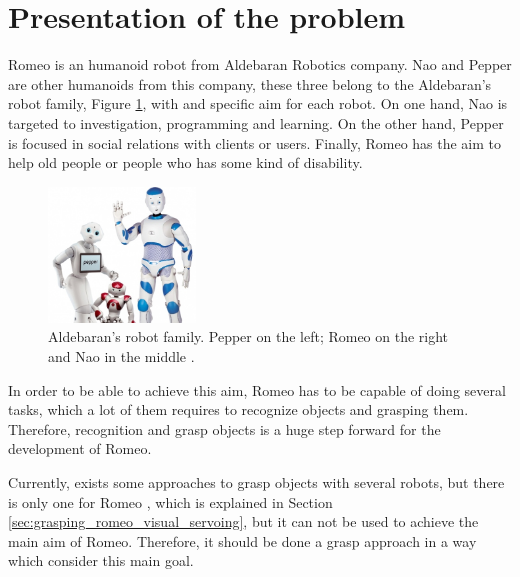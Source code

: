 \documentclass[12pt,a4paper,final,twoside,openright]{report}
\begin{document}

\section{Presentation of the problem}

Romeo is an humanoid robot from Aldebaran Robotics company. Nao and Pepper are other humanoids from this company, these three belong to the Aldebaran's robot family, Figure \ref{fig:aldebaran_family}, with and specific aim for each robot. On one hand, Nao is targeted to investigation, programming and learning. On the other hand, Pepper is focused in social relations with clients or users. Finally, Romeo has the aim to help old people or people who has some kind of disability.	

\begin{figure}
	    \centering
		\includegraphics[width=0.35\textwidth]{images/romeo_nao_pepper.jpg}
         \caption{Aldebaran's robot family. Pepper on the left; Romeo on the right and Nao in the middle \cite{ParPaul}. \label{fig:aldebaran_family}}
\end{figure}

In order to be able to achieve this aim, Romeo has to be capable of doing several tasks, which a lot of them requires to recognize objects and grasping them. Therefore, recognition and grasp objects is a huge step forward for the development of Romeo. 

Currently, exists some approaches to grasp objects with several robots, but there is only one for Romeo  \cite{claudio:hal-01159882}, which is explained in Section \ref{sec:grasping_romeo_visual_servoing}, but it can not be used to achieve the main aim of Romeo. Therefore, it should be done a grasp approach in a way which consider this main goal.  
\end{document}
